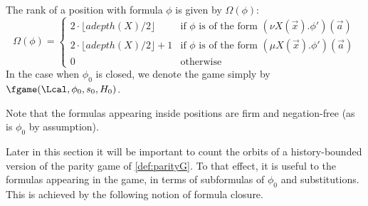 \begin{definition}
\begin{itemize}
    \end{itemize}
      The rank of a position with formula $\phi$ is given by $\Omega(\phi)$:
    \[        \Omega(\phi) =
      \begin{cases} 2 \cdot \lfloor adepth(X)/2 \rfloor & \text{if $\phi$ is of the form }(\nu X(\vec x).\phi')(\vec a)\\
        2 \cdot \lfloor adepth(X)/2 \rfloor + 1 & \text{if $\phi$ is of the form }(\mu X(\vec x).\phi')(\vec a)\\
         0 &\text{otherwise}
      \end{cases}
    \]
In the case when $\phi_0$ is closed, we denote the game simply by $\fgame(\Lcal, \phi_0, s_0, H_0)$.    
\end{definition}

Note that the formulas appearing inside positions are firm and negation-free (as is $\phi_0$ by assumption). 

%

Later in this section it will be important to count the orbits of a history-bounded version of the parity game of \cref{def:parityG}. To that effect, it is useful to the formulas appearing in the game, in terms of subformulas of $\phi_0$ and substitutions. This is achieved by the following notion of formula closure. 
  

